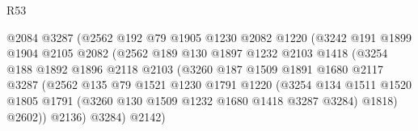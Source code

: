\begin{lexlean}{R53}
\begin{coremodule}
                                  @2084
                                  @3287
                                  (@2562
                                    @192
                                    @79
                                    @1905
                                    @1230
                                    @2082
                                    @1220
                                    (@3242
                                      @191
                                      @1899
                                      @1904
                                      @2105
                                      @2082
                                      (@2562
                                        @189
                                        @130
                                        @1897
                                        @1232
                                        @2103
                                        @1418
                                        (@3254
                                          @188
                                          @1892
                                          @1896
                                          @2118
                                          @2103
                                          (@3260
                                            @187
                                            @1509
                                            @1891
                                            @1680
                                            @2117
                                            @3287
                                            (@2562
                                              @135
                                              @79
                                              @1521
                                              @1230
                                              @1791
                                              @1220
                                              (@3254
                                                @134
                                                @1511
                                                @1520
                                                @1805
                                                @1791
                                                (@3260 @130 @1509 @1232 @1680 @1418 @3287 @3284)
                                                @1818)
                                              @2602))
                                          @2136)
                                        @3284)
                                      @2142)

\end{coremodule}
\end{lexlean}
